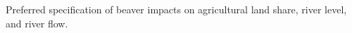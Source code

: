 
Preferred specification of beaver impacts on agricultural land share, river level, and river flow.

